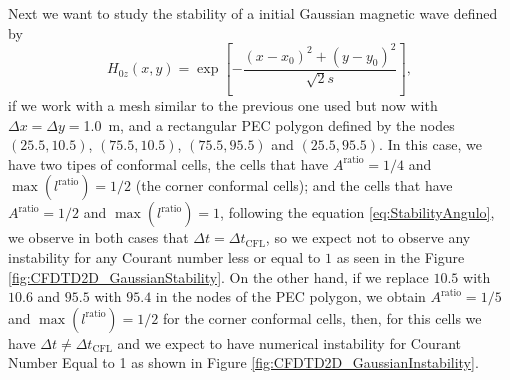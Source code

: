 \documentclass[12pt, oneside]{book}
\begin{document}
Next we want to study the stability of a initial Gaussian magnetic wave defined by 
\begin{equation}
    H_{0z}(x,y) = \exp \left[ - \dfrac{(x - x_0)^2 + (y - y_0)^2}{\sqrt{2} s} \right],
\label{eq:Gaussian2DInitialCondition}
\end{equation}
if we work with a mesh similar to the previous one used but now with $\Delta x = \Delta y =$\qty{1.0}{\metre}, and a rectangular PEC polygon defined by the nodes $(25.5,10.5)$, $(75.5,10.5)$, $(75.5, 95.5)$ and $(25.5, 95.5)$. In this case, we have two tipes of conformal cells, the cells that have $A^{\text{ratio}} = 1/4$ and $\max({l^{\text{ratio}}}) = 1/2$ (the corner conformal cells); and the cells that have $A^{\text{ratio}} = 1/2$ and $\max({l^{\text{ratio}}}) = 1$, following the equation \ref{eq:StabilityAngulo}, we observe in both cases that $\Delta t = \Delta t_{\text{CFL}}$, so we expect not to observe any instability for any Courant number less or equal to $1$ as seen in the Figure \ref{fig:CFDTD2D_GaussianStability}. On the other hand, if we replace $10.5$ with $10.6$ and $95.5$ with $95.4$ in the nodes of the PEC polygon, we obtain $A^{\text{ratio}} = 1/5$ and $\max({l^{\text{ratio}}}) = 1/2$ for the corner conformal cells, then, for this cells we have $\Delta t \neq \Delta t_{\text{CFL}}$ and we expect to have numerical instability for Courant Number Equal to 1 as shown in Figure \ref{fig:CFDTD2D_GaussianInstability}.
\end{document}
